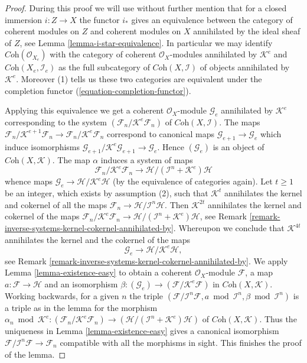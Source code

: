 \documentclass{stacks-project}
\theoremstyle{plain}
\theoremstyle{definition}
\theoremstyle{remark}
\numberwithin{equation}{subsection}
\begin{document}
\begin{proof}
During this proof we will use without further mention that for a closed
immersion $i : Z \to X$ the functor $i_*$ gives an equivalence between the
category of coherent modules on $Z$ and coherent modules on $X$ annihilated
by the ideal sheaf of $Z$, see Lemma \ref{lemma-i-star-equivalence}.
In particular we may identify $\textit{Coh}(\mathcal{O}_{X_e})$
with the category of coherent $\mathcal{O}_X$-modules annihilated by
$\mathcal{K}^e$ and $\textit{Coh}(X_e, \mathcal{I}_e)$ as the full subcategory
of $\textit{Coh}(X, \mathcal{I})$ of objects annihilated by $\mathcal{K}^e$.
Moreover (1) tells us these two categories are equivalent under the
completion functor (\ref{equation-completion-functor}).

\medskip\noindent
Applying this equivalence we get a coherent $\mathcal{O}_X$-module
$\mathcal{G}_e$ annihilated by $\mathcal{K}^e$ corresponding to the system
$(\mathcal{F}_n/\mathcal{K}^e\mathcal{F}_n)$ of
$\textit{Coh}(X, \mathcal{I})$. The maps
$\mathcal{F}_n/\mathcal{K}^{e + 1}\mathcal{F}_n \to
\mathcal{F}_n/\mathcal{K}^e\mathcal{F}_n$ correspond to canonical maps
$\mathcal{G}_{e + 1} \to \mathcal{G}_e$ which induce isomorphisms
$\mathcal{G}_{e + 1}/\mathcal{K}^e\mathcal{G}_{e + 1} \to \mathcal{G}_e$.
Hence $(\mathcal{G}_e)$ is an object of $\textit{Coh}(X, \mathcal{K})$.
The map $\alpha$ induces a system of maps
$$
\mathcal{F}_n/\mathcal{K}^e\mathcal{F}_n
\longrightarrow
\mathcal{H}/(\mathcal{I}^n + \mathcal{K}^e)\mathcal{H}
$$
whence maps $\mathcal{G}_e \to \mathcal{H}/\mathcal{K}^e\mathcal{H}$
(by the equivalence of categories again).
Let $t \geq 1$ be an integer, which exists by assumption (2),
such that $\mathcal{K}^t$ annihilates the kernel and cokernel of all the maps
$\mathcal{F}_n \to \mathcal{H}/\mathcal{I}^n\mathcal{H}$.
Then $\mathcal{K}^{2t}$ annihilates the kernel and cokernel of the maps
$\mathcal{F}_n/\mathcal{K}^e\mathcal{F}_n \to
\mathcal{H}/(\mathcal{I}^n + \mathcal{K}^e)\mathcal{H}$, see
Remark \ref{remark-inverse-systems-kernel-cokernel-annihilated-by}.
Whereupon we conclude that $\mathcal{K}^{4t}$ annihilates the kernel and
the cokernel of the maps
$$
\mathcal{G}_e
\longrightarrow
\mathcal{H}/\mathcal{K}^e\mathcal{H},
$$
see Remark \ref{remark-inverse-systems-kernel-cokernel-annihilated-by}.
We apply Lemma \ref{lemma-existence-easy} to obtain a coherent
$\mathcal{O}_X$-module $\mathcal{F}$, a map
$a : \mathcal{F} \to \mathcal{H}$ and an isomorphism
$\beta : (\mathcal{G}_e) \to (\mathcal{F}/\mathcal{K}^e\mathcal{F})$
in $\textit{Coh}(X, \mathcal{K})$. Working backwards, for a given $n$
the triple
$(\mathcal{F}/\mathcal{I}^n\mathcal{F}, a \bmod \mathcal{I}^n, \beta
\bmod \mathcal{I}^n)$ is a triple as in the lemma for the morphism
$\alpha_n \bmod \mathcal{K}^e :
(\mathcal{F}_n/\mathcal{K}^e\mathcal{F}_n) \to
(\mathcal{H}/(\mathcal{I}^n + \mathcal{K}^e)\mathcal{H})$
of $\textit{Coh}(X, \mathcal{K})$. Thus the uniqueness in
Lemma \ref{lemma-existence-easy}
gives a canonical isomorphism
$\mathcal{F}/\mathcal{I}^n\mathcal{F} \to \mathcal{F}_n$
compatible with all the morphisms in sight. This finishes the proof
of the lemma.
\end{proof}
\end{document}
